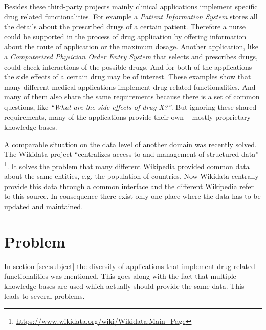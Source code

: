 Besides these third-party projects mainly clinical applications implement specific drug related functionalities.
For example a \textit{Patient Information System} stores all the details about the prescribed drugs of a certain patient.
Therefore a nurse could be supported in the process of drug application by offering information about the route of application or the maximum dosage.
Another application, like a \textit{Computerized Physician Order Entry System} that selects and prescribes drugs, could check interactions of the possible drugs.
And for both of the applications the side effects of a certain drug may be of interest.
These examples show that many different medical applications implement drug related functionalities.
And many of them also share the same requirements because there is a set of common questions, like \textit{``What are the side effects of drug X?''}.
But ignoring these shared requirements, many of the applications provide their own -- mostly proprietary -- knowledge bases.

A comparable situation on the data level of another domain was recently solved.
The Wikidata project ``centralizes access to and management of structured data'' \footnote{\url{https://www.wikidata.org/wiki/Wikidata:Main_Page}}.
It solves the problem that many different Wikipedia provided common data about the same entities, e.g. the population of countries.
Now Wikidata centrally provide this data through a common interface and the different Wikipedia refer to this source.
In consequence there exist only one place where the data has to be updated and maintained.



\section{Problem}
\label{sec:problem}

In section \ref{sec:subject} the diversity of applications that implement drug related functionalities was mentioned.
This goes along with the fact that multiple knowledge bases are used which actually should provide the same data. 
This leads to several problems.

